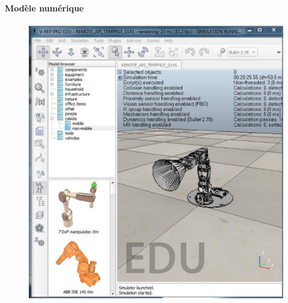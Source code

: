         \paragraph{Modèle numérique}
            \begin{figure}[!h]
            \begin{minipage}{0.495\linewidth}
                \centering
                \includegraphics[width=\linewidth]{Figures/Poppy-ErgoJr_simu}
            \end{minipage}\hfill
            \begin{minipage}{0.48\linewidth}
                \centering

\end{minipage}
\end{figure}
